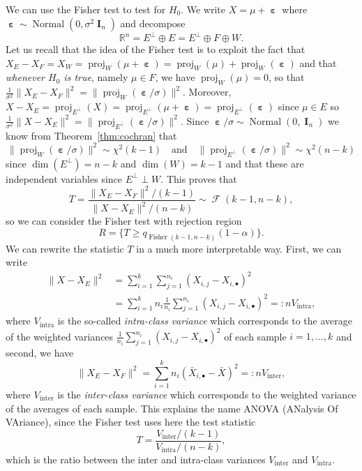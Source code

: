 \documentclass[
	fontsize=11pt, %
	twoside=false, %
	numbers=noenddot, %
]{kaobook}
\DeclareMathOperator{\cF}{{\mathcal F}}
\DeclareMathOperator{\bI}{{\boldsymbol I}}
\DeclareMathOperator{\beps}{\boldsymbol \varepsilon}
\DeclareMathOperator{\fis}{Fisher}
\DeclareMathOperator{\nor}{Normal}
\DeclareMathOperator{\proj}{proj}
\newcommand{\R}{\mathbb R}
\begin{document}
We can use the Fisher test to test for $H_0$.
We write $X = \mu + \beps$ where $\beps \sim \nor(0, \sigma^2 \bI_n)$ and decompose 
\begin{equation*}
	\R^n = E^\perp \oplus E = E^\perp \oplus F \oplus W.
\end{equation*}
Let us recall that the idea of the Fisher test is to exploit the fact that $X_E - X_F = X_W = \proj_W(\mu + \beps) = \proj_W(\mu) + \proj_W(\beps)$ and that \emph{whenever $H_0$ is true}, namely $\mu \in F$, we have $\proj_W(\mu) = 0$, so that $\frac{1}{\sigma^2} \| X_E - X_F \|^2 = \| \proj_W( \beps / \sigma) \|^2$. 
Moreover, $X - X_E = \proj_{E^\perp}(X) = \proj_{E^\perp}(\mu + \beps) = \proj_{E^\perp}(\beps)$ since $\mu \in E$ so $\frac{1}{\sigma^2} \| X - X_E \|^2 = \| \proj_{E^\perp}( \beps / \sigma) \|^2$.
Since $\beps / \sigma \sim \nor(0, \bI_n)$ we know from Theorem~\ref{thm:cochran} that
\begin{equation*}
	\| \proj_W( \beps / \sigma) \|^2 \sim \chi^2(k-1) \quad \text{and} \quad
\| \proj_{E^\perp}( \beps / \sigma) \|^2 \sim \chi^2(n-k)
\end{equation*}
since $\dim(E^\perp) = n - k$ and $\dim(W) = k-1$ and that these are independent variables since $E^\perp \perp W$.
This proves that
\begin{equation*}
  T = \frac{\| X_E - X_F \|^2 / (k-1)}{\| X - X_E \|^2 / (n-k)} \sim \cF(k-1, n-k),
\end{equation*}
so we can consider the Fisher test with rejection region 
\begin{equation*}
	R = \{ T \geq q_{\fis(k-1, n-k)}(1 - \alpha) \}.
\end{equation*}
We can rewrite the statistic $T$ in a much more interpretable way.
First, we can write
\begin{align*}
  \| X - X_E \|^2 &= \sum_{i=1}^k \sum_{j=1}^{n_i} (X_{i, j} - X_{i, \bullet})^2 \\
  &= \sum_{i=1}^k n_i  \frac{1}{n_i} \sum_{j=1}^{n_i} (X_{i, j} - X_{i, \bullet})^2 =: n V_{\text{intra}},
\end{align*}
where $V_{\text{intra}}$ is the so-called \emph{intra-class variance}%
which corresponds to the average of the weighted%
 variances $\frac{1}{n_i} \sum_{j=1}^{n_i} (X_{i, j} - X_{i, \bullet})^2$ of each sample  $i=1, \ldots, k$ and second, we have
\begin{equation*}
  \| X_E - X_F \|^2 = \sum_{i=1}^k n_i (\bar X_{i, \bullet} - \bar X)^2 =: n V_{\text{inter}},
\end{equation*}
where $V_{\text{inter}}$ is the \emph{inter-class variance} which corresponds to the weighted variance of the averages of each sample.
This explains the name ANOVA (ANalysis Of VAriance), since the Fisher test uses here the test statistic
\begin{equation*}
  T = \frac{V_\text{inter} / (k-1)}{V_\text{intra} / (n - k)},
\end{equation*}
which is the ratio between the inter and intra-class variances $V_{\text{inter}}$ and $V_\text{intra}$.
\end{document}
